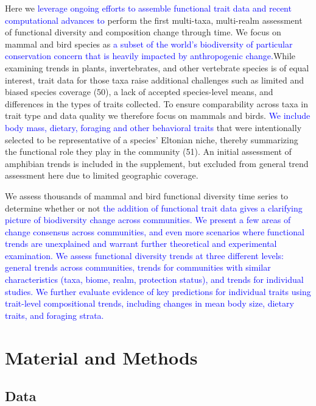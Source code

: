 \documentclass{article}
\begin{document}
Here we
\textcolor{blue}{leverage ongoing efforts to assemble functional trait data and recent computational advances to}
perform the first multi-taxa, multi-realm assessment of functional
diversity and composition change through time. We focus on mammal and
bird species as
\textcolor{blue}{a subset of the world's biodiversity of particular conservation concern that is heavily impacted by anthropogenic change.}While
examining trends in plants, invertebrates, and other vertebrate species
is of equal interest, trait data for those taxa raise additional
challenges such as limited and biased species coverage (50), a lack of
accepted species-level means, and differences in the types of traits
collected. To ensure comparability across taxa in trait type and data
quality we therefore focus on mammals and birds.
\textcolor{blue}{We include body mass, dietary, foraging and other behavioral traits}
that were intentionally selected to be representative of a species'
Eltonian niche, thereby summarizing the functional role they play in the
community (51). An initial assessment of amphibian trends is included in
the supplement, but excluded from general trend assessment here due to
limited geographic coverage.

We assess thousands of mammal and bird functional diversity time series
to determine whether or not
\textcolor{blue}{the addition of functional trait data gives a clarifying picture of biodiversity change across communities. We present a few areas of change consensus across communities, and even more scenarios where functional trends are unexplained and warrant further theoretical and experimental examination. We assess functional diversity trends at three different levels: general trends across communities, trends for communities with similar characteristics (taxa, biome, realm, protection status), and trends for individual studies. We further evaluate evidence of key predictions for individual traits using trait-level compositional trends, including changes in mean body size, dietary traits, and foraging strata.}

\hypertarget{material-and-methods}{%
\section{Material and Methods}\label{material-and-methods}}

\hypertarget{data}{%
\subsection{Data}\label{data}}
\end{document}
